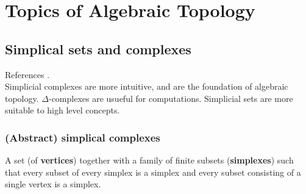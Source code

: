 \part{Topics of Algebraic Topology}



\chapter{Simplical sets and complexes}
References \cite{goerssSimplicialHomotopyTheory2009,hatcherAlgebraicTopology2021}. \\

Simplicial complexes are more intuitive, and are the foundation of algebraic topology. $\Delta$-complexes are usueful for computations. Simplicial sets are more suitable to high level concepts.


\section{(Abstract) simplical complexes}

A set (of \textbf{vertices}) together with a  family of finite subsets (\textbf{simplexes}) such that every subset of every simplex is a simplex and every subset consisting of a single vertex is a simplex.  

